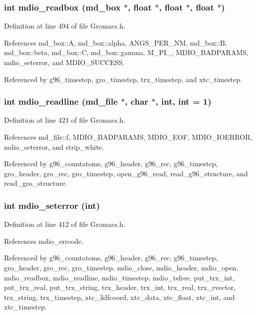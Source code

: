 \subsubsection{\setlength{\rightskip}{0pt plus 5cm}int mdio\_\-readbox ({\bf md\_\-box} $\ast$, float $\ast$, float $\ast$, float $\ast$)\hspace{0.3cm}{\tt  [static]}}\label{Gromacs_8h_a63}




Definition at line 494 of file Gromacs.h.

References md\_\-box::A, md\_\-box::alpha, ANGS\_\-PER\_\-NM, md\_\-box::B, md\_\-box::beta, md\_\-box::C, md\_\-box::gamma, M\_\-PI\_, MDIO\_\-BADPARAMS, mdio\_\-seterror, and MDIO\_\-SUCCESS.

Referenced by g96\_\-timestep, gro\_\-timestep, trx\_\-timestep, and xtc\_\-timestep.
\subsubsection{\setlength{\rightskip}{0pt plus 5cm}int mdio\_\-readline ({\bf md\_\-file} $\ast$, char $\ast$, int, int = 1)\hspace{0.3cm}{\tt  [static]}}\label{Gromacs_8h_a61}




Definition at line 421 of file Gromacs.h.

References md\_\-file::f, MDIO\_\-BADPARAMS, MDIO\_\-EOF, MDIO\_\-IOERROR, mdio\_\-seterror, and strip\_\-white.

Referenced by g96\_\-countatoms, g96\_\-header, g96\_\-rec, g96\_\-timestep, gro\_\-header, gro\_\-rec, gro\_\-timestep, open\_\-g96\_\-read, read\_\-g96\_\-structure, and read\_\-gro\_\-structure.
\subsubsection{\setlength{\rightskip}{0pt plus 5cm}int mdio\_\-seterror (int)\hspace{0.3cm}{\tt  [static]}}\label{Gromacs_8h_a59}




Definition at line 412 of file Gromacs.h.

References mdio\_\-errcode.

Referenced by g96\_\-countatoms, g96\_\-header, g96\_\-rec, g96\_\-timestep, gro\_\-header, gro\_\-rec, gro\_\-timestep, mdio\_\-close, mdio\_\-header, mdio\_\-open, mdio\_\-readbox, mdio\_\-readline, mdio\_\-timestep, mdio\_\-tsfree, put\_\-trx\_\-int, put\_\-trx\_\-real, put\_\-trx\_\-string, trx\_\-header, trx\_\-int, trx\_\-real, trx\_\-rvector, trx\_\-string, trx\_\-timestep, xtc\_\-3dfcoord, xtc\_\-data, xtc\_\-float, xtc\_\-int, and xtc\_\-timestep.

